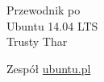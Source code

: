 \thispagestyle{empty}


\colorbox{ubuntu_orange}{
	\parbox[t]{1.0\linewidth}{
		\centering \fontsize{40pt}{70pt}\selectfont
		\vspace*{0.7cm}
		
		\hfill Przewodnik po\\
		\hfill Ubuntu 14.04 LTS\\
		\hfill Trusty Thar\par
		
		\vspace*{0.7cm}
	}
}

\vfill


{
	\centering
	\large 
	\hfill Zespół \href{http://www.ubuntu.pl}{ubuntu.pl} \\
}


\clearpage
